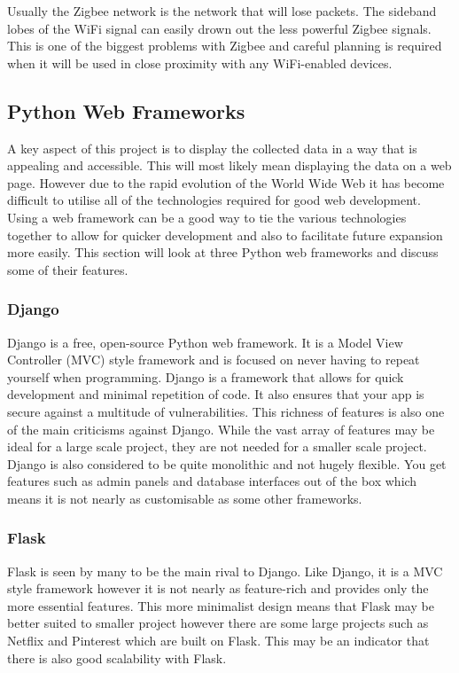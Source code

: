 \documentclass[10pt,a4paper]{article}
\begin{document}
Usually the Zigbee network is the network that will lose packets. The sideband lobes of the WiFi signal can easily drown out the less powerful Zigbee signals. This is one of the biggest problems with Zigbee and careful planning is required when it will be used in close proximity with any WiFi-enabled devices.

\subsection{Python Web Frameworks}
A key aspect of this project is to display the collected data in a way that is appealing and accessible. This will most likely mean displaying the data on a web page. However due to the rapid evolution of the World Wide Web it has become difficult to utilise all of the technologies required for good web development\citep{pop_altar_2014}. Using a web framework can be a good way to tie the various technologies together to allow for quicker development and also to facilitate future expansion more easily. This section will look at three Python web frameworks and discuss some of their features. 
\subsubsection{Django\citep{website:django}}
Django is a free, open-source Python web framework. It is a Model View Controller (MVC) style framework and is focused on never having to repeat yourself when programming. Django is a framework that allows for quick development and minimal repetition of code. It also ensures that your app is secure against a multitude of vulnerabilities. This richness of features is also one of the main criticisms against Django. While the vast array of features may be ideal for a large scale project, they are not needed for a smaller scale project. Django is also considered to be quite monolithic and not hugely flexible. You get features such as admin panels and database interfaces out of the box which means it is not nearly as customisable as some other frameworks. 
\subsubsection{Flask\citep{website:flask}}
Flask is seen by many to be the main rival to Django. Like Django, it is a MVC style framework however it is not nearly as feature-rich and provides only the more essential features. This more minimalist design means that Flask may be better suited to smaller project however there are some large projects such as Netflix and Pinterest which are built on Flask. This may be an indicator that there is also good scalability with Flask. 
\end{document}
